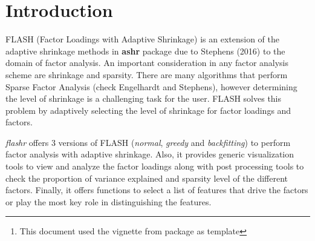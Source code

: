 \documentclass[12pt]{article}\usepackage[]{graphicx}\usepackage[usenames,dvipsnames]{color}
\author{Wei Wang, Kushal K Dey \& Matthew Stephens \\[1em] \small{\textit{Stephens Lab}, The University of Chicago} \mbox{ }\\ \small{\texttt{$^*$Correspondending Email: mstephens@uchicago.edu}}}
\newcommand{\flashr}{\textit{flashr}}
\begin{document}
\maketitle

\begin{abstract}
  \vspace{1em}
  The \R{} package \flashr{} provides tools to perform factor analysis with adaptive shrinkage on the factor loadings and the factors and also provides means to visualization of the factor analysis results. The adaptive shrinkage is performed using the \textbf{ashr} package due to Stephens (2016).

  The package provides generic functions to visualize loadings data and post processing functions to analyze the factors estimated with focus on sparsity and the proportion of variance in the data explained by each factor. It also provides a list of features that play the key role in distinguishing the factors.

\vspace{1em}
\textbf{\flashr{} version:} 0.1.1 \footnote{This document used the vignette from \Bioconductor{} package  as  template}

\end{abstract}




\newpage

\tableofcontents

\section{Introduction}

FLASH (Factor Loadings with Adaptive Shrinkage) is an extension of the adaptive shrinkage methods in \textbf{ashr} package due to Stephens (2016) to the domain of factor analysis. An important consideration in any factor analysis scheme are shrinkage and sparsity. There are many algorithms that perform Sparse Factor Analysis (check Engelhardt and Stephens), however determining the level of shrinkage is a challenging task for the user. FLASH solves this problem by adaptively selecting the level of shrinkage for factor loadings and factors.

\flashr{} offers 3 versions of FLASH (\textit{normal}, \textit{greedy} and \textit{backfitting}) to perform factor analysis with adaptive shrinkage. Also, it provides generic visualization tools to view and analyze the factor loadings along with post processing tools to check the proportion of variance explained and sparsity level of the different factors. Finally, it offers functions to select a list of features that drive the factors or play the most key role in distinguishing the features.
\end{document}
